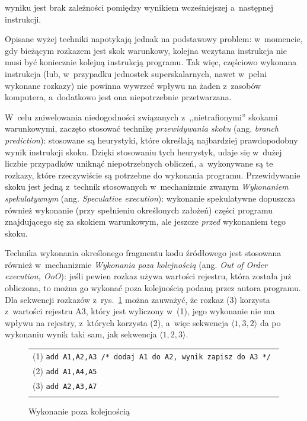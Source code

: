 \documentclass[11pt,makeidx]{mwart}
\begin{document}
	wyniku jest brak zależności pomiędzy wynikiem wcześniejszej a~następnej instrukcji.
\par
%
\indent
	Opisane wyżej techniki napotykają jednak na podstawowy problem: w~momencie, gdy bieżącym rozkazem jest skok warunkowy, kolejna wczytana 
	instrukcja nie musi być koniecznie kolejną instrukcją programu. Tak więc, częściowo wykonana instrukcja (lub, w~przypadku jednostek
	superskalarnych, nawet w~pełni wykonane rozkazy) nie powinna wywrzeć wpływu na żaden z~zasobów komputera, 
	a~dodatkowo jest ona niepotrzebnie przetwarzana.
\par
%
\indent
	W~celu zniwelowania niedogodności związanych z~,,nietrafionymi'' skokami warunkowymi, zaczęto stosować technikę 
	\emph{przewidywania skoku} (ang. \emph{branch prediction}): stosowane są heurystyki, które określają najbardziej prawdopodobny
	wynik instrukcji skoku. Dzięki stosowaniu tych heurystyk, udaje się w~dużej liczbie przypadków uniknąć niepotrzebnych obliczeń,
	a~wykonywane są te rozkazy, które rzeczywiście są potrzebne do wykonania programu.
	Przewidywanie skoku jest jedną z~technik stosowanych w~mechanizmie zwanym \emph{Wykonaniem spekulatywnym} (ang. \emph{Speculative execution}):
	wykonanie spekulatywne dopuszcza również wykonanie (przy spełnieniu określonych założeń) części programu znajdującego się za skokiem warunkowym,
	ale jeszcze \emph{przed} wykonaniem tego skoku.
\par
%
\indent
	Technika wykonania określonego fragmentu kodu źródłowego jest stosowana również w~mechanizmie \emph{Wykonania poza kolejnością}
	(ang. \emph{Out of Order execution, OoO}): jeśli pewien rozkaz używa wartości rejestru, która została już obliczona, to można go wykonać
	poza kolejnością podaną przez autora programu. Dla sekwencji rozkazów z~rys.~\ref{fig:oooex}
	można zauważyć, że rozkaz (3) korzysta z~wartości rejestru A3, który jest wyliczony w~(1), jego wykonanie nie ma wpływu na rejestry, z~których 
	korzysta (2), a~więc sekwencja $\langle 1, 3, 2 \rangle $ da po wykonaniu wynik taki sam, jak sekwencja $\langle 1, 2, 3 \rangle $.
	\begin{figure}[h]
	\begin{tabular}{l}\\
		(1) {\tt add A1,A2,A3 /* dodaj A1 do A2, wynik zapisz do A3 */ } \\
		(2) {\tt add A1,A4,A5 } \\
		(3) {\tt add A2,A3,A7 } \\
		\\
	\end{tabular}
	\caption{Wykonanie poza kolejnością}
	\label{fig:oooex}
	\end{figure}
\end{document}
